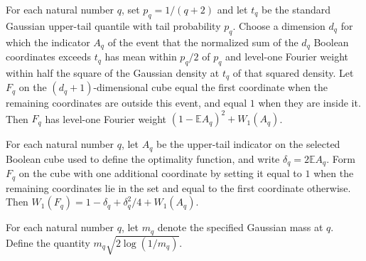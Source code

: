 \begin{theorem}
\label{FABL.fourierWeightAtLevel_one_fknOptimalityFunction}
\leanok
{}
For each natural number $q$, set $p_q=1/(q+2)$ and let $t_q$ be the standard Gaussian
upper-tail quantile with tail probability $p_q$. Choose a dimension $d_q$ for which the
indicator $A_q$ of the event that the normalized sum of the $d_q$ Boolean coordinates
exceeds $t_q$ has mean within $p_q/2$ of $p_q$ and level-one Fourier weight within half
the square of the Gaussian density at $t_q$ of that squared density. Let $F_q$ on the
$(d_q+1)$-dimensional cube equal the first coordinate when the remaining coordinates are
outside this event, and equal $1$ when they are inside it. Then $F_q$ has level-one
Fourier weight $(1-\mathbb{E}A_q)^2+W_1(A_q)$.
\end{theorem}

\begin{theorem}
\label{FABL.fourierWeightAtLevel_one_fknOptimalityFunction_eq_delta}
\leanok
{}
For each natural number $q$, let $A_q$ be the upper-tail indicator on the selected
Boolean cube used to define the optimality function, and write
$\delta_q=2\mathbb{E}A_q$. Form $F_q$ on the cube with one additional coordinate by
setting it equal to $1$ when the remaining coordinates lie in the set and equal to the
first coordinate otherwise. Then $W_1(F_q)=1-\delta_q+\delta_q^2/4+W_1(A_q)$.
\end{theorem}

\begin{definition}
\label{FABL.fknOptimalityGaussianMain}
\leanok
{}
For each natural number $q$, let $m_q$ denote the specified Gaussian mass at $q$. Define
the quantity $m_q\sqrt{2\log(1/m_q)}$.
\end{definition}

